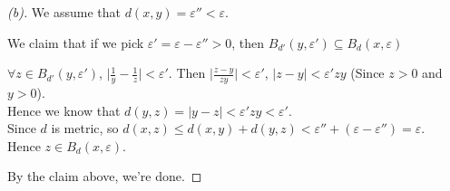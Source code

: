 \begin{proof}[(b)]
    We assume that $d(x,y) = \varepsilon'' < \varepsilon$.
    \begin{claim}
        We claim that if we pick $\varepsilon' = \varepsilon - \varepsilon'' > 0$, then $B_{d'}(y,\varepsilon') \subseteq B_d(x,\varepsilon)$
    \end{claim}
    \begin{explanation}
        $\forall z \in B_{d'}(y, \varepsilon')$, $\lvert \frac{1}{y} - \frac{1}{z} \rvert < \varepsilon'$. Then $\lvert \frac{z-y}{zy} \rvert < \varepsilon'$, $\lvert z-y \rvert < \varepsilon'zy$ (Since $z > 0$ and $y > 0$). \\
        Hence we know that $d(y,z) = \lvert y-z \rvert < \varepsilon'zy < \varepsilon'$. \\
        Since $d$ is metric, so $d(x,z) \leq d(x,y) + d(y,z) < \varepsilon'' + (\varepsilon - \varepsilon'') = \varepsilon$. \\
        Hence $z \in B_d(x, \varepsilon)$.
    \end{explanation}
    By the claim above, we're done.
\end{proof}

